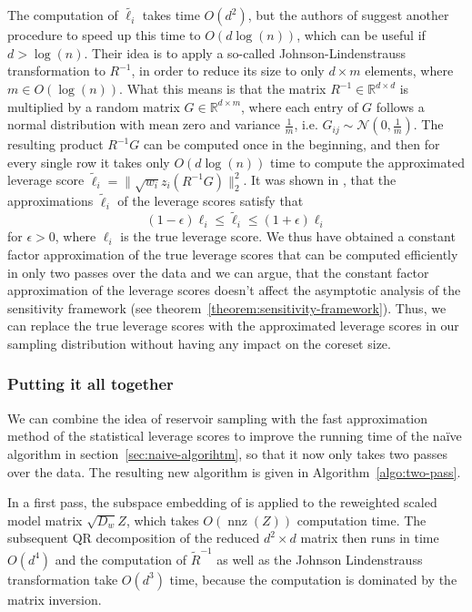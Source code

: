 The computation of $\tilde{\ell_i}$ takes time $O(d^2)$, but
the authors of \cite{leverage-scores-drineas} suggest another
procedure to speed up this time to $O(d \log(n))$, which can be
useful if $d > \log(n)$.
Their idea is to apply a so-called Johnson-Lindenstrauss
transformation \cite{johnson-lindenstrauss} to $R^{-1}$,
in order to reduce its size to only $d \times m$ elements,
where $m \in O(\log(n))$. What this means is that the matrix
$R^{-1} \in \mathbb{R}^{d \times d}$ is multiplied by a random matrix
$G \in \mathbb{R}^{d \times m}$, where each entry of $G$
follows a normal distribution with mean zero and variance
$\frac{1}{m}$, i.e. $G_{ij} \sim \mathcal{N}(0, \frac{1}{m})$.
The resulting product $R^{-1}G$ can be computed once in the beginning,
and then for every single row it takes only
$O(d \log(n))$ time to compute the approximated leverage
score $\tilde{\ell}_i = \lVert \sqrt{w_i} z_i (R^{-1} G) \rVert_2^2$.
It was shown in \cite{leverage-scores-drineas}, that the
approximations $\tilde{\ell}_i$ of the leverage scores satisfy that
\begin{equation*}
    (1 - \epsilon) \ell_i \leq \tilde{\ell}_i \leq (1 + \epsilon) \ell_i
\end{equation*}
for $\epsilon > 0$, where $\ell_i$ is the true leverage score.
We thus have obtained a constant factor
approximation of the true leverage scores that can be computed
efficiently in only two passes over the data and we can argue,
that the constant factor approximation of the leverage scores
doesn't affect the asymptotic analysis of the sensitivity
framework (see theorem~\ref{theorem:sensitivity-framework}).
Thus, we can replace the true leverage scores with the approximated
leverage scores in our sampling distribution without having any
impact on the coreset size.

\subsubsection{Putting it all together}

We can combine the idea of reservoir sampling with the fast approximation
method of the statistical leverage scores to improve
the running time of the na\"ive algorithm
in section~\ref{sec:naive-algorihtm}, so that it now only takes two
passes over the data. The resulting new algorithm is
given in Algorithm~\ref{algo:two-pass}.

In a first pass, the subspace embedding of \cite{woodruff-2017}
is applied to the reweighted scaled model matrix
$\sqrt{D_w}Z$, which takes
$O(\operatorname{nnz}(Z))$ computation time. The subsequent
QR decomposition of the reduced $d^2 \times d$ matrix then runs
in time $O(d^4)$ and the computation of $\tilde{R}^{-1}$
as well as the Johnson Lindenstrauss transformation take
$O(d^3)$ time, because the computation is dominated by the
matrix inversion.

